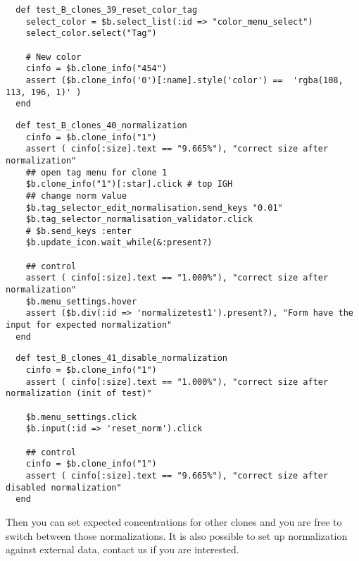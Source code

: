 \begin{verbatim}
  def test_B_clones_39_reset_color_tag
    select_color = $b.select_list(:id => "color_menu_select")
    select_color.select("Tag")

    # New color
    cinfo = $b.clone_info("454")
    assert ($b.clone_info('0')[:name].style('color') ==  'rgba(108, 113, 196, 1)' )
  end
\end{verbatim}

\begin{verbatim}
  def test_B_clones_40_normalization
    cinfo = $b.clone_info("1")
    assert ( cinfo[:size].text == "9.665%"), "correct size after normalization"
    ## open tag menu for clone 1
    $b.clone_info("1")[:star].click # top IGH
    ## change norm value
    $b.tag_selector_edit_normalisation.send_keys "0.01"
    $b.tag_selector_normalisation_validator.click
    # $b.send_keys :enter
    $b.update_icon.wait_while(&:present?)

    ## control
    assert ( cinfo[:size].text == "1.000%"), "correct size after normalization"
    $b.menu_settings.hover
    assert ($b.div(:id => 'normalizetest1').present?), "Form have the input for expected normalization"
  end
\end{verbatim}

\begin{verbatim}
  def test_B_clones_41_disable_normalization
    cinfo = $b.clone_info("1")
    assert ( cinfo[:size].text == "1.000%"), "correct size after normalization (init of test)"
    
    $b.menu_settings.click
    $b.input(:id => 'reset_norm').click

    ## control
    cinfo = $b.clone_info("1")
    assert ( cinfo[:size].text == "9.665%"), "correct size after disabled normalization"
  end
\end{verbatim}

Then you can set expected concentrations for other clones and you are free to
switch between those normalizations.
It is also possible to set up normalization against external data,
contact us if you are interested.

